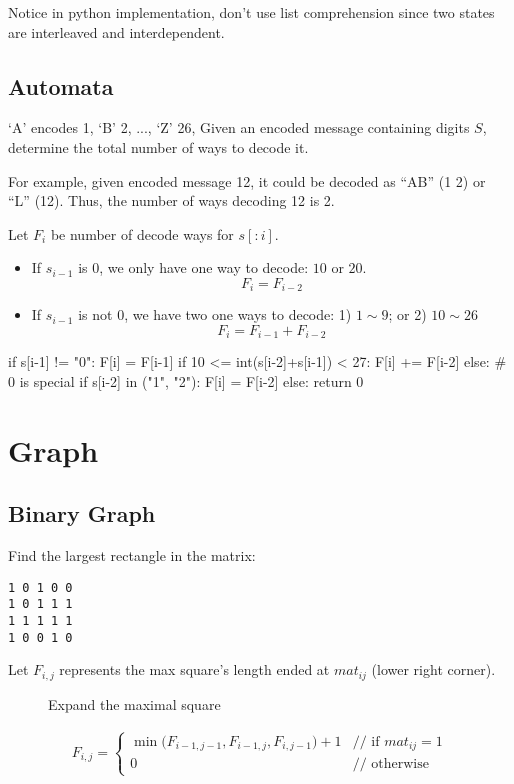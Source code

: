Notice in python implementation, don't use list comprehension since two states are interleaved and interdependent. 
\subsection{Automata}
 `A' encodes 1, `B' 2, ..., `Z' 26, Given an encoded message containing digits $S$, determine the total number of ways to decode it.

For example, given encoded message 12, it could be decoded as ``AB'' (1 2) or ``L'' (12). Thus, the number of ways decoding 12 is 2.

Let $F_i$ be number of decode ways for $s[:i]$. 

\begin{itemize}
\item If $s_{i-1}$ is 0, we only have one way to decode: $10$ or $20$.
$$
F_i = F_{i-2}
$$ 
\item If $s_{i-1}$ is not 0, we have two one ways to decode: 1) $1 \sim 9$; or 2) $10 \sim26$
$$
F_i = F_{i-1}+F_{i-2}
$$
\end{itemize}
\begin{python}
if s[i-1] != "0":
    F[i] = F[i-1]
    if 10 <= int(s[i-2]+s[i-1]) < 27:
        F[i] += F[i-2]
else:  # 0 is special
    if s[i-2] in ("1", "2"):
        F[i] = F[i-2]
    else:
        return 0
\end{python}
\section{Graph}
\subsection{Binary Graph}
 Find the largest rectangle in the matrix:
\begin{lstlisting}
1 0 1 0 0
1 0 1 1 1
1 1 1 1 1
1 0 0 1 0
\end{lstlisting}
Let $F_{i, j}$ represents the max square's length ended at $mat_{ij}$ (lower right
corner).

\begin{figure}[!htp]
\centering
{}
\caption{Expand the maximal square}
\label{fig:squareMatrix}
\end{figure}
\begin{eqnarray*}
F_{i, j} = \left\{ \begin{array}{rl}
  \min\big(F_{i-1, j-1}, F_{i-1, j}, F_{i, j-1}\big)+1 &\mbox{// if $mat_{i j}=1$}
\\
  0 &\mbox{// otherwise}
       \end{array} \right.
\end{eqnarray*}
